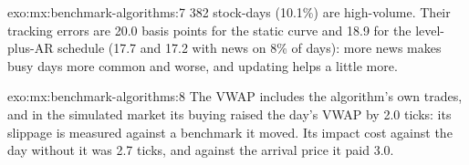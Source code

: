 \begin{solution}{exo:mx:benchmark-algorithms:7}
382 stock-days (10.1\%) are high-volume. Their tracking errors are 20.0 basis points for the static curve and 18.9 for the level-plus-AR schedule
(17.7 and 17.2 with news on 8\% of days): more news makes busy days more common and worse, and updating helps a little more.
\end{solution}

\begin{solution}{exo:mx:benchmark-algorithms:8}
The VWAP includes the algorithm's own trades, and in the simulated market its buying raised the day's VWAP by 2.0 ticks: its slippage is measured
against a benchmark it moved. Its impact cost against the day without it was 2.7 ticks, and against the arrival price it paid 3.0.
\end{solution}

